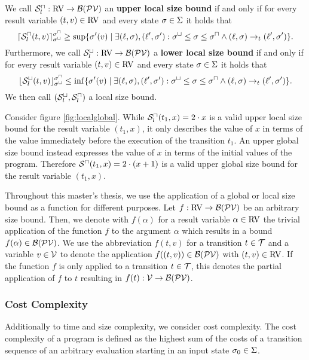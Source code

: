 \begin{definition}
  We call ${\mathcal{S}^\sqcap_l}: \text{RV} \rightarrow \mathcal{B}(\mathcal{PV})$ an \textbf{upper local size bound} if and only if for every result variable $(t, v) \in \text{RV}$ and every state $\sigma \in \Sigma$ it holds that
  \[ \lceil {\mathcal{S}^\sqcap_l}(t, v) \rceil^{{\sigma^\sqcap}}_{{\sigma^\sqcup}} \geq \sup \lbrace \sigma'(v) \mid \exists (\ell, \sigma), (\ell', \sigma'): {\sigma^\sqcup} \leq \sigma \leq {\sigma^\sqcap} \wedge (\ell, \sigma) \rightarrow_t (\ell', \sigma') \rbrace. \]
  Furthermore, we call ${\mathcal{S}^\sqcup_l}: \text{RV} \rightarrow \mathcal{B}(\mathcal{PV})$ a \textbf{lower local size bound} if and only if for every result variable $(t, v) \in \text{RV}$ and every state $\sigma \in \Sigma$ it holds that
  \[ \lfloor {\mathcal{S}^\sqcup_l}(t, v) \rfloor^{{\sigma^\sqcap}}_{{\sigma^\sqcup}} \leq \inf \lbrace \sigma'(v) \mid \exists (\ell, \sigma), (\ell', \sigma'): {\sigma^\sqcup} \leq \sigma \leq {\sigma^\sqcap} \wedge (\ell, \sigma) \rightarrow_t (\ell', \sigma') \rbrace. \]
  We then call ${({\mathcal{S}^\sqcup_l}, {\mathcal{S}^\sqcap_l})}$ a local size bound.
\end{definition}



Consider figure \ref{fig:localglobal}.
While ${\mathcal{S}^\sqcap_l}(t_1, x) = 2 \cdot x$ is a valid upper local size bound for the result variable $(t_1, x)$, it only describes the value of $x$ in terms of the value immediately before the execution of the transition $t_1$.
An upper global size bound instead expresses the value of $x$ in terms of the initial values of the program.
Therefore ${\mathcal{S}^\sqcap}(t_1, x) = 2 \cdot (x + 1)$ is a valid upper global size bound for the result variable $(t_1, x)$.

Throughout this master's thesis, we use the application of a global or local size bound as a function for different purposes.
Let $f: \text{RV} \rightarrow \mathcal{B}(\mathcal{PV})$ be an arbitrary size bound.
Then, we denote with $f(\alpha)$ for a result variable $\alpha \in \text{RV}$ the trivial application of the function $f$ to the argument $\alpha$ which results in a bound $f(\alpha) \in \mathcal{B}(\mathcal{PV})$.
We use the abbreviation $f(t, v)$ for a transition $t \in \mathcal{T}$ and a variable $v \in \mathcal{V}$ to denote the application $f((t,v)) \in \mathcal{B}(\mathcal{PV})$ with $(t,v) \in \text{RV}$.
If the function $f$ is only applied to a transition $t \in \mathcal{T}$, this denotes the partial application of $f$ to $t$ resulting in $f(t): \mathcal{V} \rightarrow \mathcal{B}(\mathcal{PV})$.

\subsubsection{Cost Complexity}

Additionally to time and size complexity, we consider cost complexity.
The cost complexity of a program is defined as the highest sum of the costs of a transition sequence of an arbitrary evaluation starting in an input state $\sigma_0 \in \Sigma$.


